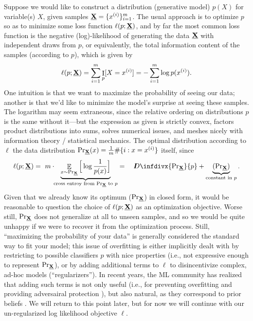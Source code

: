 \documentclass{article}
\theoremstyle{plain}
\theoremstyle{definition}
\theoremstyle{remark}
\let\H\relax
\DeclareMathOperator{\H}{\mathrm{H}} %
\DeclareMathOperator{\I}{\mathrm{I}} %
\DeclareMathOperator*{\Ex}{\mathbb{E}} %
\newcommand{\thickD}{I\mkern-8muD}
\newcommand{\kldiv}{\thickD\infdivx}
\newcommand{\datadist}[1]{\Pr\nolimits_{#1}}
\begin{document}
Suppose we would like to construct a distribution (generative model) $p(X)$ for variable(s) $X$, given samples ${\underline{\mathbf{X}}} = \{ x^{(i)} \}_{i=1}^m$. The usual approach is to optimize $p$ so as to minimize some loss function $\ell(p; {\underline{\mathbf{X}}})$, and by far the most common loss function is the negative (log)-likelihood of generating the data ${\underline{\mathbf{X}}}$ with independent draws from $p$, or equivalently, the total information content of the samples (according to $p$), which is given by 
\begin{equation}
 	\ell(p; \xsamp) = \sum_{i=1}^m \I_p[ X = x^{(i)}]  %
	= -\sum_{i=1}^m \log p(x^{(i)}). \label{eq:negloglike} \end{equation}
One intuition is that we want to maximize the probability of seeing our data; another is that we'd like to minimize the model's surprise at seeing these samples.%
The logarithm may seem extraneous, since the relative ordering on distributions $p$ is the same without it---but the expression as given is strictly convex, factors product distributions into sums, solves numerical issues, and meshes nicely with information theory / statistical mechanics.
The optimal distribution according to $\ell$ the data distribution 
$\datadist\xsamp(x) = \frac1m \#\{i : x = x^{(i)}\}$  itself, since
\[ 
	\ell(p; \xsamp) =~ m \cdot\!\! \underbrace{\Ex_{x \sim \datadist\xsamp} \Big[ \log \frac1{p(x)}\Big] }_{\text{cross entroy from $\datadist\xsamp$ to $p$}} =\quad \kldiv{\datadist\xsamp}{p} + \underbrace{\H(\datadist\xsamp)}_{\text{constant in $p$}}. 
\] 
Given that we already know its optimum ($\datadist\xsamp$) in closed form, it would be reasonable to question the choice of $\ell(p;{\underline{\mathbf{X}}})$ as an optimization objective. Worse still, $\datadist\xsamp$ does not generalize at all to unseen samples, and so we would be quite unhappy if we were to recover it from the optimization process. 
Still, ``maximizing the probability of your data'' is generally considered the standard way to fit your model; this issue of overfitting is either implicitly dealt with by  restricting to possible classifiers $p$ with nice properties (i.e., not expressive enough to represent $\datadist\xsamp$), or by adding additional terms to $\ell$ to disincentivize complex, ad-hoc models (``regularizers'').
In recent years, the ML community has realized that adding such terms is not only useful (i.e., for preventing overfitting \cite{} and providing adversairal protection \cite{}), but also natural, as they correspond to prior beliefs \cite{}.
We will return to this point later, but for now we will continue with our un-regularized log likelihood objective $\ell$.
\end{document}
